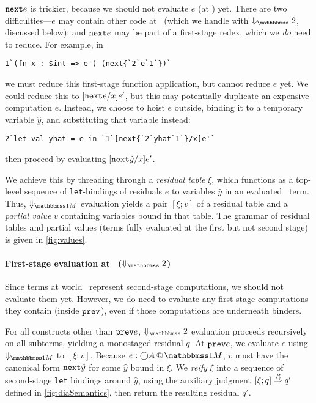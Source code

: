 \begin{abstrsyn}
${\tt next}{e}$ is trickier, because we should not evaluate $e$ (at \bbtwo) yet.
There are two difficulties---$e$ may contain other code at \bbonem\ (which we
handle with $\redtwosym$, discussed below); and ${\tt next}{e}$ may be part of a
first-stage redex, which we \emph{do} need to reduce. For example, in
\begin{lstlisting} 
1`(fn x : $int => e') (next{`2`e`1`})`
\end{lstlisting}
we must reduce this first-stage function application, but cannot reduce $e$ yet.
We could reduce this to $[{\tt next}{e}/x]e'$, but this may potentially duplicate an
expensive computation $e$. Instead, we choose to hoist $e$ outside, binding it
to a temporary variable $\hat{y}$, and substituting that variable instead:
\begin{lstlisting} 
2`let val yhat = e in `1`[next{`2`yhat`1`}/x]e'`
\end{lstlisting}
then proceed by evaluating $[{\tt next}{\hat{y}}/x]e'$.

We achieve this by threading through a \emph{residual table} $\xi$, which
functions as a top-level sequence of \texttt{let}-bindings of residuals $e$ to
variables $\hat{y}$ in an evaluated \bbonem\ term. Thus, $\redonesym$ evaluation
yields a pair $[\xi;v]$ of a residual table and a \emph{partial value} $v$
containing variables bound in that table. The grammar of residual tables and
partial values (terms fully evaluated at the first but not second stage) is
given in \ref{fig:values}.


\paragraph{First-stage evaluation at \bbtwo\ ($\redtwosym$)}
Since terms at world \bbtwo\ represent second-stage computations, we should not
evaluate them yet. However, we do need to evaluate any first-stage computations
they contain (inside ${\tt prev}$), even if those computations are underneath
binders.

For all constructs other than ${\tt prev}{e}$, $\redtwosym$ evaluation proceeds
recursively on all subterms, yielding a monostaged residual $q$. At ${\tt prev}{e}$,
we evaluate $e$ using $\redonesym$ to $[\xi;v]$. Because $\colmix e{\fut A}$,
$v$ must have the canonical form ${\tt next}{\hat{y}}$ for some $\hat{y}$ bound in $\xi$. We \emph{reify}
$\xi$ into a sequence of second-stage \texttt{let} bindings around $\hat{y}$,
using the auxiliary judgment $[{\xi};{q}]\overset{R}\Rightarrow{q'}$ defined in
\ref{fig:diaSemantics}, then return the resulting residual $q'$.

\end{abstrsyn}

